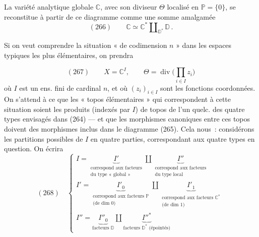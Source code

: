 \documentclass[11pt,a4paper]{article}
\begin{document}


La variété analytique globale $\mathbb{C}$, avec son diviseur $\Theta$ localisé en $\mathbb{P}=\{0\}$, se reconstitue à partir de ce diagramme comme une somme amalgamée
\[ (266)\qquad \mathbb{C}\simeq\mathbb{C}^*\amalg_{\mathbb{D}^*}\mathbb{D}\,. \]

Si on veut comprendre la situation « de codimension $n$ » dans  les espaces typiques les plus élémentaires, on prendra

\[ (267)\qquad X=\mathbb{C}^I,\qquad \Theta=\operatorname{div}\Big(\prod_{i\in I}z_i\Big) \]
où $I$ est un ens. fini de cardinal $n$, et où $(z_i)_{i\in I}$ sont les fonctions coordonnées. On s'attend à ce que les « topos élémentaires » qui correspondent à cette situation soient les produits (indexés par $I$) de topos de l'un quelc. des quatre types envisagés dans (264) --- et que les morphismes canoniques entre ces topos doivent   des morphismes inclus dans le diagramme (265). Cela nous \struck{\ill{}} \,: considérons les partitions possibles de $I$ en quatre parties, correspondant aux quatre types en question. On écrira
\[ (268)\quad \left\{\begin{array}{l} I=\underbrace{I'}_{\substack{\text{correspond aux facteurs}\\ \text{du type « global »}}}\amalg\underbrace{I''}_{\substack{\text{correspond aux facteurs}\\ \text{du type local}}}\\[18pt] I'=\underbrace{I'_0}_{\substack{\text{correspond aux facteurs } \mathbb{P}\\ \text{(de dim 0)}}}\amalg\underbrace{I'_1}_{\substack{\text{correspond aux facteurs } \mathbb{C}^*\\ \text{(de dim 1)}}}\\[18pt] I''=\underbrace{I''_0}_{\text{facteurs } \mathbb{D}}\amalg\underbrace{I''^*}_{\text{facteurs } \mathbb{D}^* \text{ (épointés)}} \end{array}\right. \]
\end{document}
